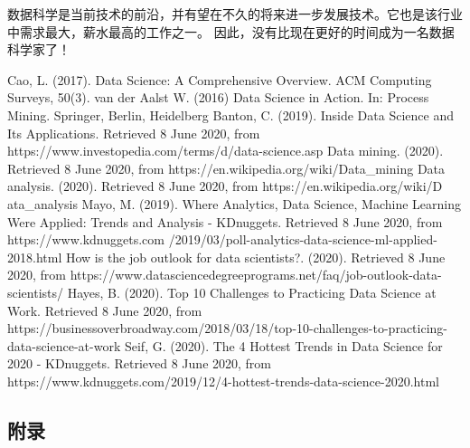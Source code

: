 \documentclass[a4paper, 11pt,twoside=true,UTF8]{scrartcl}
\begin{document}
数据科学是当前技术的前沿，并有望在不久的将来进一步发展技术。它也是该行业中需求最大，薪水最高的工作之一。 因此，没有比现在更好的时间成为一名数据科学家了！\\

\newpage
\begin{thebibliography}{99}
	Cao, L. (2017). Data Science: A Comprehensive Overview. ACM Computing Surveys, 50(3).
	van der Aalst W. (2016) Data Science in Action. In: Process Mining. Springer, Berlin, Heidelberg
	Banton, C. (2019). Inside Data Science and Its Applications. Retrieved 8 June 2020, from https://www.investopedia.com/terms/d/data-science.asp
	Data mining. (2020). Retrieved 8 June 2020, from https://en.wikipedia.org/wiki/Data\_mining
	Data analysis. (2020). Retrieved 8 June 2020, from https://en.wikipedia.org/wiki/D
	ata\_analysis
	Mayo, M. (2019). Where Analytics, Data Science, Machine Learning Were Applied:
	Trends and Analysis - KDnuggets. Retrieved 8 June 2020, from https://www.kdnuggets.com
	/2019/03/poll-analytics-data-science-ml-applied-2018.html
	How is the job outlook for data scientists?. (2020). Retrieved 8 June 2020, from https://www.datasciencedegreeprograms.net/faq/job-outlook-data-scientists/
	Hayes, B. (2020). Top 10 Challenges to Practicing Data Science at Work. Retrieved 8 June 2020, from https://businessoverbroadway.com/2018/03/18/top-10-challenges-to-practicing-data-science-at-work
	Seif, G. (2020). The 4 Hottest Trends in Data Science for 2020 - KDnuggets. Retrieved 8 June 2020, from https://www.kdnuggets.com/2019/12/4-hottest-trends-data-science-2020.html
\end{thebibliography}


\newpage
\subsection*{附录}
\end{document}
